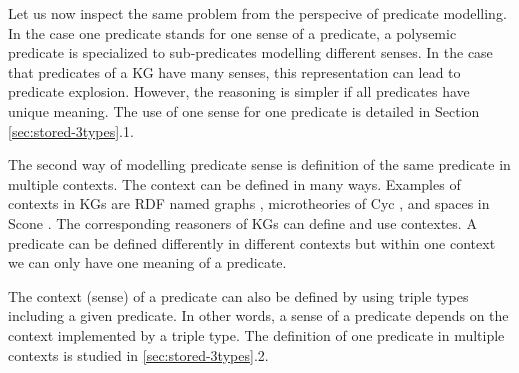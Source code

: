 \documentclass[runningheads]{llncs}
\newcommand{\memo}[1]{}
\newcommand{\notes}[1]{\noindent\begin{small}-- \emph{#1}\hfill\break\end{small}}
\begin{document}
Let us now inspect the same problem from the perspecive of predicate
modelling. In the case one predicate stands for one sense of a
predicate, a polysemic predicate is specialized to sub-predicates
modelling different senses. In the case that predicates of a KG have
many senses, this representation can lead to predicate
explosion. However, the reasoning is simpler if all predicates have
unique meaning. %
The use of one sense for one predicate is detailed in Section
\ref{sec:stored-3types}.1.

The second way of modelling predicate sense is definition of the same
predicate in multiple contexts. The context can be defined in many
ways. Examples of contexts in KGs are RDF named graphs
\cite{Carroll2005}, microtheories of Cyc \cite{cyc}, and spaces in
Scone \cite{Fahlman2011}. The corresponding reasoners of KGs can
define and use contextes. A predicate can be defined differently in
different contexts but within one context we can only have one meaning
of a predicate.

The context (sense) of a predicate can also be defined by using triple
types including a given predicate. In other words, a sense of a
predicate depends on the context implemented by a triple type. The
definition of one predicate in multiple contexts is studied in
\ref{sec:stored-3types}.2.

\memo{
\notes{Whitin an ontology it seems that the triple type can be used, quite naturally, as the context of a predicate.}
\notes{The meaning of predicate is modelled by a triple type including concrete classes, types of domains and ranges.}
\notes{We have one triple type (predicate and types of S and O) mapped to one meaning.}
\notes{The representation requires using contextual reasoning \cite{cyc}.}
\notes{One of the pros is that contextual representation and reasoning is close to the natural language \cite{Fahlman2011}.}
\notes{Pitfalls of word sense disambiguation and contextual reasoning....}}

\memo{
How to define types of predicates when we have $\land$ and $\lor$-types possibly in different ontologies, RDF graphs, or KGs.
Different situations where and how the domains and ranges of predicate can be defined.
List some possibilities: diff ontologies, diff contexts, explicit definition of union in a context,...
We are goiung to use OWL syntax for the definition of domains and ranges.
For simplicity we assume that for each predicate we have a definition of the domain (range) in disjunctive noraml form.
}
\end{document}
